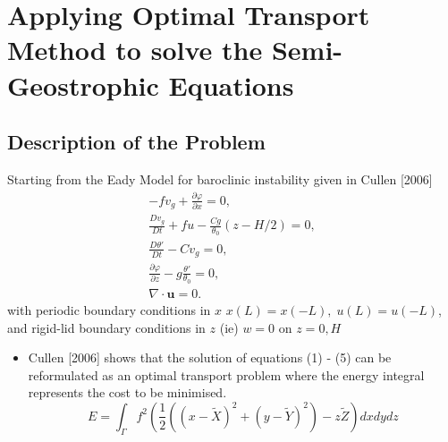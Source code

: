 \documentclass[]{article}
\begin{document}
\section{Applying Optimal Transport Method to solve the Semi-Geostrophic Equations}
	\subsection{Description of the Problem}
	Starting from the Eady Model for baroclinic instability given in Cullen [2006]
	\begin{align}
	-fv_g + \frac{\partial \varphi}{\partial x} = 0,\\
	\frac{Dv_g}{Dt} + fu -\frac{Cg}{\theta _0}\left(z-H/2\right) = 0,\\
	\frac{D\theta'}{Dt} - Cv_g = 0,\\
	\frac{\partial \varphi}{\partial z} - g\frac{\theta'}{\theta_0} = 0,\\
	\nabla \cdot \bm{u} = 0.
	\end{align}
	with periodic boundary conditions in $x$ \color{red} $x(L) = x(-L), \; u(L) = u(-L)$, \color{black} and rigid-lid boundary conditions in $z$ (ie) $w = 0$ on $z = 0, H$
	\begin{itemize}
		\item Cullen [2006] shows that the solution of equations (1) - (5) can be reformulated as an optimal transport problem where the energy integral represents the cost to be minimised.
		\begin{equation}
		E = \int_ \Gamma f^2 \left(\frac{1}{2}\left(\left(x - \tilde{X}\right)^2 +\left(y - \tilde{Y}\right)^2\right) - z\tilde{Z}\right)dxdydz
		\end{equation}
	\end{itemize}
\end{document}
